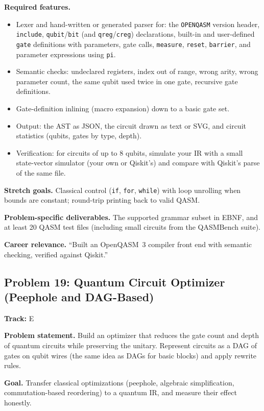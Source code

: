 \documentclass[11pt,a4paper]{article}
\newcommand{\fld}[1]{\par\smallskip\textbf{\color{accent}#1}\quad}
\newcommand{\meta}[1]{%
  \begin{tcolorbox}[colback=softbg,colframe=softbg,boxsep=2pt,left=4pt,right=4pt,top=2pt,bottom=2pt,arc=2pt]
  \small\textbf{Track:} #1
  \end{tcolorbox}}
\begin{document}
\fld{Required features.}
\begin{itemize}
  \item Lexer and hand-written or generated parser for: the \texttt{OPENQASM} version header, \texttt{include}, \texttt{qubit}/\texttt{bit} (and \texttt{qreg}/\texttt{creg}) declarations, built-in and user-defined \texttt{gate} definitions with parameters, gate calls, \texttt{measure}, \texttt{reset}, \texttt{barrier}, and parameter expressions using \texttt{pi}.
  \item Semantic checks: undeclared registers, index out of range, wrong arity, wrong parameter count, the same qubit used twice in one gate, recursive gate definitions.
  \item Gate-definition inlining (macro expansion) down to a basic gate set.
  \item Output: the AST as JSON, the circuit drawn as text or SVG, and circuit statistics (qubits, gates by type, depth).
  \item Verification: for circuits of up to 8 qubits, simulate your IR with a small state-vector simulator (your own or Qiskit's) and compare with Qiskit's parse of the same file.
\end{itemize}

\fld{Stretch goals.} Classical control (\texttt{if}, \texttt{for}, \texttt{while}) with loop
unrolling when bounds are constant; round-trip printing back to valid QASM.

\fld{Problem-specific deliverables.} The supported grammar subset in EBNF, and at least 20 QASM test
files (including small circuits from the QASMBench suite).

\fld{Career relevance.} ``Built an OpenQASM~3 compiler front end with semantic checking, verified against Qiskit.''

\subsection{Problem 19: Quantum Circuit Optimizer (Peephole and DAG-Based)}
\meta{E}

\fld{Problem statement.} Build an optimizer that reduces the gate count and depth of quantum circuits
while preserving the unitary. Represent circuits as a DAG of gates on qubit wires (the same idea as
DAGs for basic blocks) and apply rewrite rules.

\fld{Goal.} Transfer classical optimizations (peephole, algebraic simplification, commutation-based
reordering) to a quantum IR, and measure their effect honestly.
\end{document}
